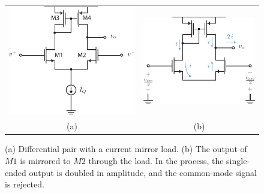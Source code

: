 \begin{figure}[H]
\centering
\begin{tabular}{cc}
\includegraphics[scale=1.05]{Diffpair_se_output} &
\includegraphics[scale=1.05]{Diffpair_se_ac}\\
(a) & (b)\\
\end{tabular}
\caption{(a) Differential pair with a current mirror load.  (b) The output of $M1$ is mirrored to $M2$ through the load. In the process, the single-ended output is doubled in amplitude, and the common-mode signal is rejected.}
\label{fig:Diffpair_se_output}
\end{figure}
